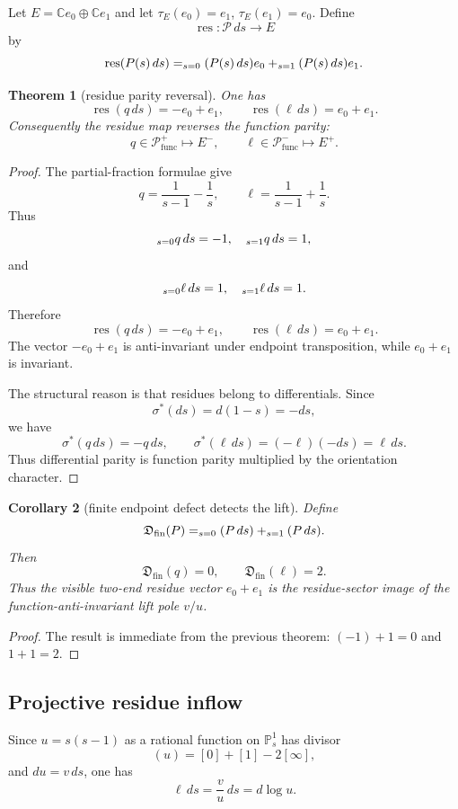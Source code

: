 \documentclass[11pt]{article}
\newtheorem{theorem}{Theorem}[section]
\newtheorem{corollary}[theorem]{Corollary}
\let\Res\relax
\DeclareMathOperator{\Res}{Res}
\newcommand{\C}{\mathbb C}
\newcommand{\Fin}{\operatorname{fin}}
\newcommand{\func}{\operatorname{func}}
\begin{document}
Let $E=\C e_0\oplus\C e_1$ and let $\tau_E(e_0)=e_1$, $\tau_E(e_1)=e_0$.
Define
\[
\operatorname{res}:\mathcal P\,ds\to E
\]
by
\[
\operatorname{res}(P(s)\,ds)=\Res_{s=0}(P(s)\,ds)e_0+
\Res_{s=1}(P(s)\,ds)e_1.
\]

\begin{theorem}[residue parity reversal]
One has
\[
\operatorname{res}(q\,ds)=-e_0+e_1,
\qquad
\operatorname{res}(\ell\,ds)=e_0+e_1.
\]
Consequently the residue map reverses the function parity:
\[
q\in\mathcal P^+_{\func}\mapsto E^- ,
\qquad
\ell\in\mathcal P^-_{\func}\mapsto E^+ .
\]
\end{theorem}

\begin{proof}
The partial-fraction formulae give
\[
q=\frac1{s-1}-\frac1s,
\qquad
\ell=\frac1{s-1}+\frac1s.
\]
Thus
\[
\Res_{s=0}q\,ds=-1,
\quad
\Res_{s=1}q\,ds=1,
\]
and
\[
\Res_{s=0}\ell\,ds=1,
\quad
\Res_{s=1}\ell\,ds=1.
\]
Therefore
\[
\operatorname{res}(q\,ds)=-e_0+e_1,
\qquad
\operatorname{res}(\ell\,ds)=e_0+e_1.
\]
The vector $-e_0+e_1$ is anti-invariant under endpoint transposition, while
$e_0+e_1$ is invariant.

The structural reason is that residues belong to differentials.  Since
\[
\sigma^*(ds)=d(1-s)=-ds,
\]
we have
\[
\sigma^*(q\,ds)=-q\,ds,
\qquad
\sigma^*(\ell\,ds)=(-\ell)(-ds)=\ell\,ds.
\]
Thus differential parity is function parity multiplied by the orientation character.
\end{proof}

\begin{corollary}[finite endpoint defect detects the lift]
Define
\[
\mathfrak D_{\Fin}(P)=\Res_{s=0}(P\,ds)+\Res_{s=1}(P\,ds).
\]
Then
\[
\mathfrak D_{\Fin}(q)=0,
\qquad
\mathfrak D_{\Fin}(\ell)=2.
\]
Thus the visible two-end residue vector $e_0+e_1$ is the residue-sector image of the
function-anti-invariant lift pole $v/u$.
\end{corollary}

\begin{proof}
The result is immediate from the previous theorem:
$(-1)+1=0$ and $1+1=2$.
\end{proof}

\subsection{Projective residue inflow}

Since $u=s(s-1)$ as a rational function on $\mathbb P^1_s$ has divisor
\[
(u)=[0]+[1]-2[\infty],
\]
and $du=v\,ds$, one has
\[
\ell\,ds=\frac vu\,ds=d\log u.
\]
\end{document}
